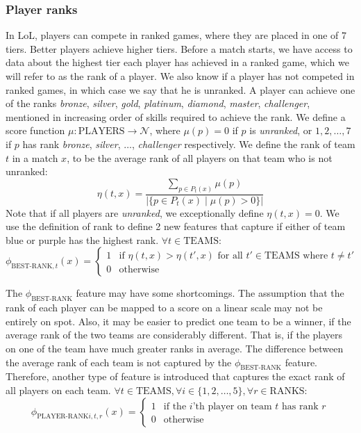 \subsubsection{Player ranks}
In LoL, players can compete in ranked games, where they are placed in one of 7 tiers. Better players achieve higher tiers.
Before a match starts, we have access to data about the highest tier each player has achieved in a ranked game, which we will refer to as the rank of a player. We also know if a player has not competed in ranked games, in which case we say that he is unranked.
A player can achieve one of the ranks \textit{bronze}, \textit{silver}, \textit{gold}, \textit{platinum}, \textit{diamond}, \textit{master}, \textit{challenger}, mentioned in increasing order of skills required to achieve the rank.
We define a score function $\mu : \text{PLAYERS} \rightarrow \mathcal{N}$, where $\mu(p) = 0$ if $p$ is \textit{unranked}, or $1, 2, \dots, 7$ if $p$ has rank \textit{bronze}, \textit{silver}, $\dots$, \textit{challenger} respectively.
We define the rank of team $t$ in a match $x$, to be the average rank of all players on that team who is not unranked:
\begin{equation}\label{eq:eta}
\eta(t, x) = \frac{\sum\limits_{p \in P_t(x)} \mu(p)}{|\{p \in P_t(x) \mid \mu(p) > 0\}|}
\end{equation}
Note that if all players are \textit{unranked}, we exceptionally define $\eta(t, x) = 0$. We use the definition of rank to define 2 new features that capture if either of team blue or purple has the highest rank.
$\forall t \in \text{TEAMS}$:
\begin{equation}\label{eq:bestrank}
\phi_{\text{BEST-RANK},t}(x) = 
\begin{cases} 
  1 & \text{if } \eta(t,x) > \eta(t',x) \text{ for all } t' \in \text{TEAMS where } t \neq t'\\
  0 & \text{otherwise} 
\end{cases}  
\end{equation}

The $\phi_\text{BEST-RANK}$ feature may have some shortcomings. The assumption that the rank of each player can be mapped to a score on a linear scale may not be entirely on spot.
Also, it may be easier to predict one team to be a winner, if the average rank of the two teams are considerably different. That is, if the players on one of the team have much greater ranks in average. The difference between the average rank of each team is not captured by the $\phi_\text{BEST-RANK}$ feature.
Therefore, another type of feature is introduced that captures the exact rank of all players on each team.
$\forall t \in \text{TEAMS}, \forall i \in \{1,2,\dots,5\}, \forall r \in \text{RANKS}$:
\begin{equation}\label{eq:playerrank}
\phi_{\text{PLAYER-RANK}i,t,r}(x) = 
\begin{cases} 
  1 & \text{if the } i \text{'th player on team } t \text{ has rank } r\\
  0 & \text{otherwise} 
\end{cases}  
\end{equation}

